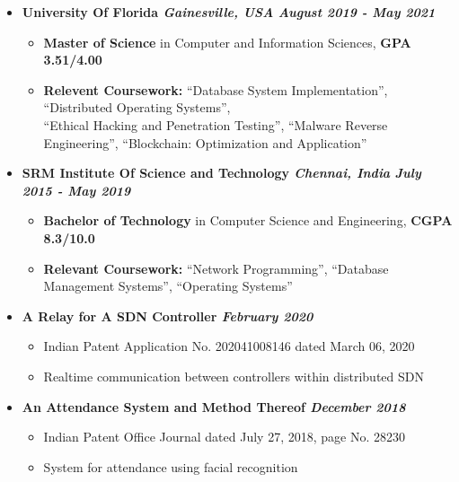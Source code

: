 \documentclass[9]{Resume}
\begin{document}
\begin{itemize}[noitemsep,nolistsep]
    \item[]\textbf{University Of Florida \textit{{\scriptsize Gainesville, USA}} \hfill \textit{August 2019 - May 2021}}
        \begin{itemize}[leftmargin=*]
            \setlength\itemsep{-0.25em}
            \item[\textbullet]{\footnotesize \textbf{Master of Science} in Computer and Information Sciences, \textbf{GPA 3.51/4.00}}
            \item[\textbullet]{\footnotesize \textbf{Relevent Coursework:}
                ``Database System Implementation'', ``Distributed Operating Systems'',\\
                ``Ethical Hacking and Penetration Testing'', ``Malware Reverse Engineering'',
                ``Blockchain: Optimization and Application''}
        \end{itemize}
    \item[]\textbf{SRM Institute Of Science and Technology \textit{{\scriptsize Chennai, India}} \hfill \textit{July 2015 - May 2019}}
        \begin{itemize}[leftmargin=*]
            \setlength\itemsep{-0.25em}
            \item[\textbullet]{\footnotesize \textbf{Bachelor of Technology} in Computer Science and Engineering, \textbf{CGPA 8.3/10.0}}
            \item[\textbullet]{\footnotesize \textbf{Relevant Coursework:}
                                        ``Network Programming'', ``Database Management Systems'', ``Operating Systems''}
        \end{itemize}
\end{itemize}

\begin{itemize}[noitemsep,nolistsep]
    \item[]\textbf{A Relay for A SDN Controller \hfill \textit{February 2020}}
        \begin{itemize}[leftmargin=*]
            \setlength\itemsep{-0.25em}
            \item[\textbullet]Indian Patent Application No. 202041008146 dated March 06, 2020
            \item[\textbullet]Realtime communication between controllers within distributed SDN
        \end{itemize}
    \item[]\textbf{An Attendance System and Method Thereof \hfill \textit{December 2018}}
        \begin{itemize}[leftmargin=*]
            \setlength\itemsep{-0.25em}
            \item[\textbullet]Indian Patent Office Journal dated July 27, 2018, page No. 28230
            \item[\textbullet]System for attendance using facial recognition
        \end{itemize}
\end{itemize}
\end{document}
